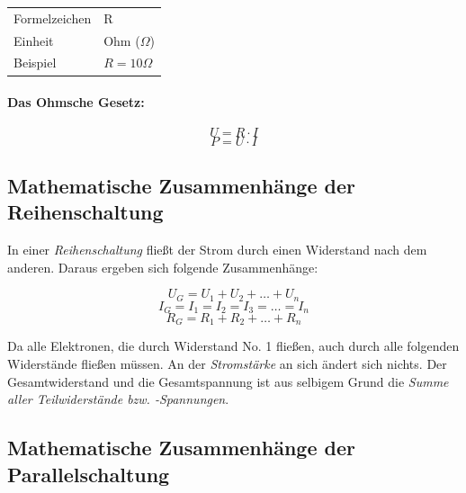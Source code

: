 \documentclass[a4paper, 12pt]{report}
\begin{document}
\begin{multicols}{2}
\begin{center}
    \begin{tabular}{ ll }
		Formelzeichen & R            \\
		Einheit       & Ohm ($\Omega$)   \\
		Beispiel      & $R = 10\Omega$    \\
	\end{tabular}
\end{center}

\paragraph{Das Ohmsche Gesetz:}

\begin{center}
    \begin{equation}
	U = R \cdot I
    \end{equation}
    \begin{equation}
	P = U \cdot I
    \end{equation}
\end{center}

\subsection{Mathematische Zusammenhänge der Reihenschaltung}

In einer \emph{Reihenschaltung} fließt der Strom durch einen Widerstand nach
dem anderen. Daraus ergeben sich folgende Zusammenhänge:

\begin{center}
    \begin{equation}
	U_G = U_1 + U_2 + \dots + U_n
    \end{equation}
    \begin{equation}
	I_G = I_1 = I_2 = I_3 = \dots = I_n
    \end{equation}
    \begin{equation}
	R_G = R_1 + R_2 + \dots + R_n
    \end{equation}
\end{center}

Da alle Elektronen, die durch Widerstand No. 1 fließen, auch durch alle
folgenden Widerstände fließen müssen. An der \emph{Stromstärke} an sich ändert
sich nichts. Der Gesamtwiderstand und die Gesamtspannung ist aus selbigem Grund
die \emph{Summe aller Teilwiderstände bzw. -Spannungen}.

\subsection{Mathematische Zusammenhänge der Parallelschaltung}


\end{multicols}
\end{document}
